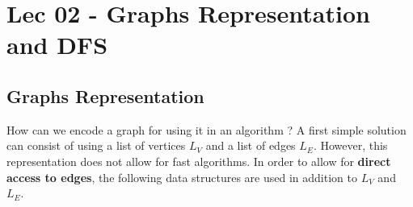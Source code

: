 \chapter{Lec 02 - Graphs Representation and DFS}

\section{Graphs Representation}
How can we encode a graph for using it in an algorithm ? A first simple solution can consist of using a list of vertices $L_{V}$ and a list of edges $L_{E}$. However, this representation does not allow for fast algorithms.\newline\newline
In order to allow for \textbf{direct access to edges}, the following data structures are used in addition to $L_{V}$ and $L_{E}$.

